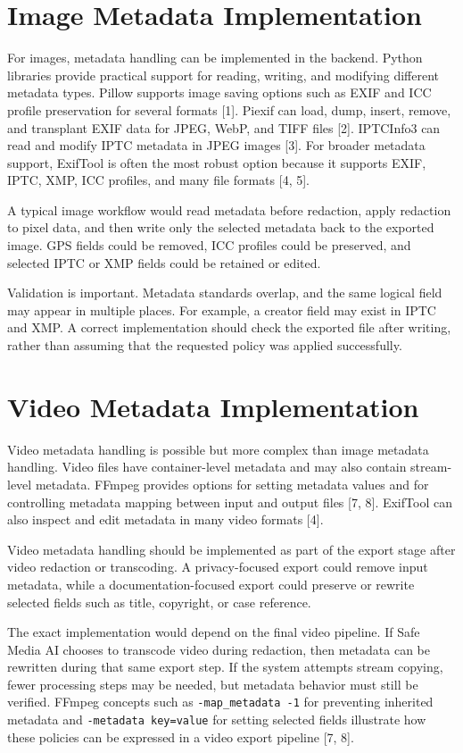 \section{Image Metadata Implementation}
For images, metadata handling can be implemented in the backend. Python libraries provide practical support for reading, writing, and modifying different metadata types. Pillow supports image saving options such as EXIF and ICC profile preservation for several formats [1]. Piexif can load, dump, insert, remove, and transplant EXIF data for JPEG, WebP, and TIFF files [2]. IPTCInfo3 can read and modify IPTC metadata in JPEG images [3]. For broader metadata support, ExifTool is often the most robust option because it supports EXIF, IPTC, XMP, ICC profiles, and many file formats [4, 5].

A typical image workflow would read metadata before redaction, apply redaction to pixel data, and then write only the selected metadata back to the exported image. GPS fields could be removed, ICC profiles could be preserved, and selected IPTC or XMP fields could be retained or edited.

Validation is important. Metadata standards overlap, and the same logical field may appear in multiple places. For example, a creator field may exist in IPTC and XMP. A correct implementation should check the exported file after writing, rather than assuming that the requested policy was applied successfully.

\section{Video Metadata Implementation}
Video metadata handling is possible but more complex than image metadata handling. Video files have container-level metadata and may also contain stream-level metadata. FFmpeg provides options for setting metadata values and for controlling metadata mapping between input and output files [7, 8]. ExifTool can also inspect and edit metadata in many video formats [4].

Video metadata handling should be implemented as part of the export stage after video redaction or transcoding. A privacy-focused export could remove input metadata, while a documentation-focused export could preserve or rewrite selected fields such as title, copyright, or case reference.

The exact implementation would depend on the final video pipeline. If Safe Media AI chooses to transcode video during redaction, then metadata can be rewritten during that same export step. If the system attempts stream copying, fewer processing steps may be needed, but metadata behavior must still be verified. FFmpeg concepts such as \texttt{-map\_metadata -1} for preventing inherited metadata and \texttt{-metadata key=value} for setting selected fields illustrate how these policies can be expressed in a video export pipeline [7, 8].

